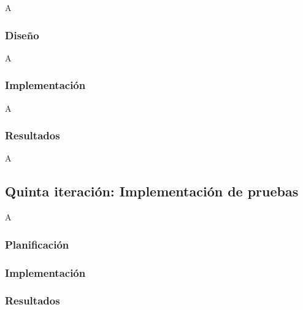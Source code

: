 A

\subsubsection{Diseño}

A

\subsubsection{Implementación}

A

\subsubsection{Resultados}

A

\subsection{Quinta iteración: Implementación de pruebas}

A

\subsubsection{Planificación}

\subsubsection{Implementación}

\subsubsection{Resultados}

